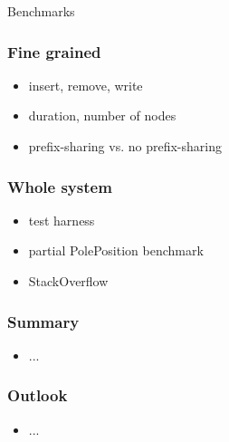 \documentclass{beamer}
\begin{document}
  \begin{section}{Benchmarks}
    \begin{frame}
      \frametitle{Fine grained}
        \begin{itemize}
          \item insert, remove, write
          \item duration, number of nodes
          \item prefix-sharing vs. no prefix-sharing
        \end{itemize}
    \end{frame}
    \begin{frame}
      \frametitle{Whole system}
        \begin{itemize}
          \item test harness
          \item partial PolePosition benchmark
          \item StackOverflow
        \end{itemize}
    \end{frame}
  \end{section}

  \begin{frame}
    \frametitle{Summary}
      \begin{itemize}
        \item ...
      \end{itemize}
  \end{frame}

  \begin{frame}
    \frametitle{Outlook}
      \begin{itemize}
        \item ...
      \end{itemize}
  \end{frame}
\end{document}
